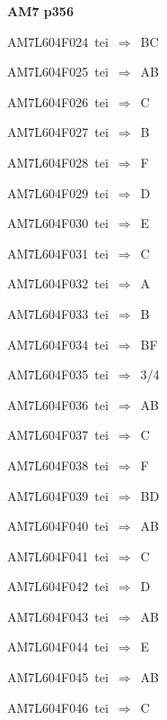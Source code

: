 \par\vfill\eject
{\bf\hfill AM7 p356\hfill\hbox{}}\par\bigskip
{\sixrm AM7L604F024\ {\sixit tei}\ }$\Rightarrow$\ BC\par\smallskip
{\sixrm AM7L604F025\ {\sixit tei}\ }$\Rightarrow$\ AB\par\smallskip
{\sixrm AM7L604F026\ {\sixit tei}\ }$\Rightarrow$\ C\par\smallskip
{\sixrm AM7L604F027\ {\sixit tei}\ }$\Rightarrow$\ B\par\smallskip
{\sixrm AM7L604F028\ {\sixit tei}\ }$\Rightarrow$\ F\par\smallskip
{\sixrm AM7L604F029\ {\sixit tei}\ }$\Rightarrow$\ D\par\smallskip
{\sixrm AM7L604F030\ {\sixit tei}\ }$\Rightarrow$\ E\par\smallskip
{\sixrm AM7L604F031\ {\sixit tei}\ }$\Rightarrow$\ C\par\smallskip
{\sixrm AM7L604F032\ {\sixit tei}\ }$\Rightarrow$\ A\par\smallskip
{\sixrm AM7L604F033\ {\sixit tei}\ }$\Rightarrow$\ B\par\smallskip
{\sixrm AM7L604F034\ {\sixit tei}\ }$\Rightarrow$\ BF\par\smallskip
{\sixrm AM7L604F035\ {\sixit tei}\ }$\Rightarrow$\ 3/4\par\smallskip
{\sixrm AM7L604F036\ {\sixit tei}\ }$\Rightarrow$\ AB\par\smallskip
{\sixrm AM7L604F037\ {\sixit tei}\ }$\Rightarrow$\ C\par\smallskip
{\sixrm AM7L604F038\ {\sixit tei}\ }$\Rightarrow$\ F\par\smallskip
{\sixrm AM7L604F039\ {\sixit tei}\ }$\Rightarrow$\ BD\par\smallskip
{\sixrm AM7L604F040\ {\sixit tei}\ }$\Rightarrow$\ AB\par\smallskip
{\sixrm AM7L604F041\ {\sixit tei}\ }$\Rightarrow$\ C\par\smallskip
{\sixrm AM7L604F042\ {\sixit tei}\ }$\Rightarrow$\ D\par\smallskip
{\sixrm AM7L604F043\ {\sixit tei}\ }$\Rightarrow$\ AB\par\smallskip
{\sixrm AM7L604F044\ {\sixit tei}\ }$\Rightarrow$\ E\par\smallskip
{\sixrm AM7L604F045\ {\sixit tei}\ }$\Rightarrow$\ AB\par\smallskip
{\sixrm AM7L604F046\ {\sixit tei}\ }$\Rightarrow$\ C\par\smallskip

